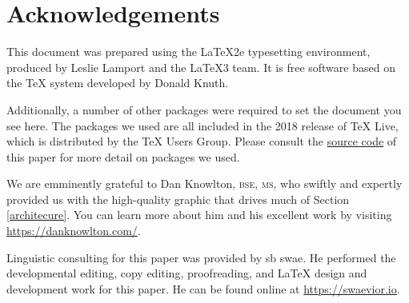 \section{Acknowledgements}
This document was prepared using the \LaTeX2e typesetting environment, produced by Leslie Lamport and the \LaTeX3 team. It is free software based on the \TeX{} system developed by Donald Knuth.

Additionally, a number of other packages were required to set the document you see here. The packages we used are all included in the 2018 release of \TeX{} Live, which is distributed by the \TeX{} Users Group. Please consult the \href{https://github.com/durachain/whitepaper}{source code} of this paper for more detail on packages we used.

We are emminently grateful to Dan Knowlton, \textsc{bse}, \textsc{ms}, who swiftly and expertly provided us with the high-quality graphic that drives much of Section \ref{architecure}. You can learn more about him and his excellent work by visiting \url{https://danknowlton.com/}.

Linguistic consulting for this paper was provided by sb swae. He performed the developmental editing, copy editing, proofreading, and \LaTeX{} design and development work for this paper. He can be found online at \url{https://swaevior.io}.
